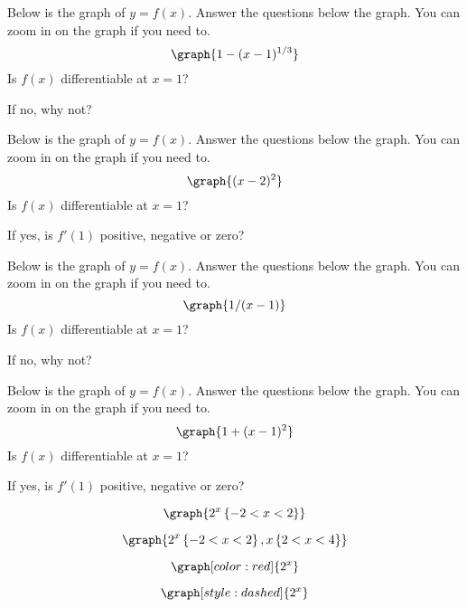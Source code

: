 \documentclass{ximera}
\begin{document}
\begin{problem}
Below is the graph of $y = f(x)$.  Answer the questions below the graph.  You can zoom in on the graph if you need to.
\[
\graph{1 - (x-1)^{1/3}}
\]
Is $f(x)$ differentiable at $x = 1$?
\begin{multipleChoice}
\end{multipleChoice}
If no, why not?
\begin{multipleChoice}
\end{multipleChoice}
\end{problem}



\begin{problem}
Below is the graph of $y = f(x)$.  Answer the questions below the graph.  You can zoom in on the graph if you need to.
\[
\graph{(x-2)^2}
\]
Is $f(x)$ differentiable at $x = 1$?
\begin{multipleChoice}
\end{multipleChoice}
If yes, is $f'(1)$ positive, negative or zero?
\begin{multipleChoice}
\end{multipleChoice}
\end{problem}


\begin{problem}
Below is the graph of $y = f(x)$.  Answer the questions below the graph.  You can zoom in on the graph if you need to.
\[
\graph{1/(x-1)}
\]
Is $f(x)$ differentiable at $x = 1$?
\begin{multipleChoice}
\end{multipleChoice}
If no, why not?
\begin{multipleChoice}
\end{multipleChoice}
\end{problem}



\begin{problem}
Below is the graph of $y = f(x)$.  Answer the questions below the graph.  You can zoom in on the graph if you need to.
\[
\graph{1 + (x-1)^2}
\]
Is $f(x)$ differentiable at $x = 1$?
\begin{multipleChoice}
\end{multipleChoice}
If yes, is $f'(1)$ positive, negative or zero?
\begin{multipleChoice}
\end{multipleChoice}
\end{problem}




\[
\graph{2^x \left \{-2<x<2\right \}}
\]

\[
\graph{2^x \left \{-2<x<2\right \}, x \left \{2<x<4 \right \}}
\]


\[
\graph[color:red]{2^x}
\]

\[
\graph[style:dashed]{2^x}
\]
\end{document}
